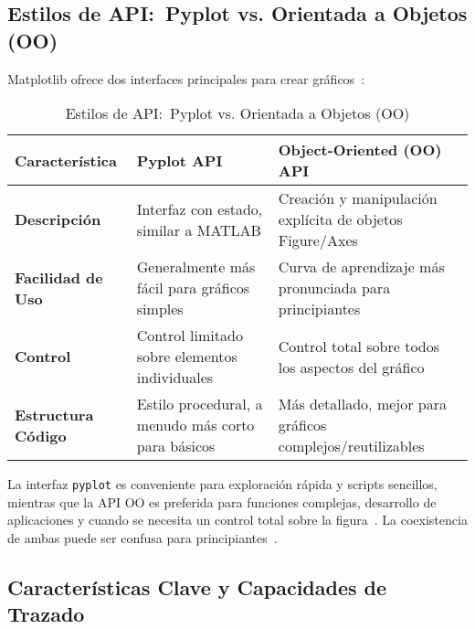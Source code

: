 \subsection{Estilos de API:\ Pyplot vs. Orientada a Objetos (OO)}%
\label{subsec:estilos_api}

Matplotlib ofrece dos interfaces principales para crear gráficos~\cite{ActiveStateMatplotlib}:

\begin{table}[htbp]
\centering
\caption{Estilos de API:\ Pyplot vs. Orientada a Objetos (OO)}%
\label{tab:api_styles}
\begin{tabular}{@{}p{}p{}p{}@{}}
\toprule
\textbf{Característica}      & \textbf{Pyplot API}                                       & \textbf{Object-Oriented (OO) API}                              \\
\midrule
\textbf{Descripción}     & Interfaz con estado, similar a MATLAB            & Creación y manipulación explícita de objetos Figure/Axes \\
\textbf{Facilidad de Uso}& Generalmente más fácil para gráficos simples     & Curva de aprendizaje más pronunciada para principiantes \\
\textbf{Control}         & Control limitado sobre elementos individuales    & Control total sobre todos los aspectos del gráfico      \\
\textbf{Estructura Código}& Estilo procedural, a menudo más corto para básicos & Más detallado, mejor para gráficos complejos/reutilizables \\
\bottomrule
\end{tabular}
\end{table}

La interfaz \texttt{pyplot} es conveniente para exploración rápida y scripts sencillos, mientras que la API OO es preferida para funciones complejas, desarrollo de aplicaciones y cuando se necesita un control total sobre la figura~\cite{ActiveStateMatplotlib, MatplotlibDevTeamPyplotTut}. La coexistencia de ambas puede ser confusa para principiantes~\cite{RedditBioinfoMatplotlibSucks}.

\subsection{Características Clave y Capacidades de Trazado}%
\label{subsec:caracteristicas_trazado}

